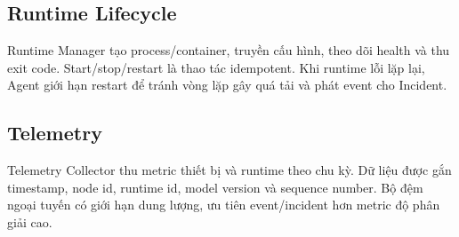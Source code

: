 \subsection{Runtime Lifecycle}

Runtime Manager tạo process/container, truyền cấu hình, theo dõi health và thu
exit code. Start/stop/restart là thao tác idempotent. Khi runtime lỗi lặp lại, Agent
giới hạn restart để tránh vòng lặp gây quá tải và phát event cho Incident.

\subsection{Telemetry}

Telemetry Collector thu metric thiết bị và runtime theo chu kỳ. Dữ liệu được gắn
timestamp, node id, runtime id, model version và sequence number. Bộ đệm ngoại
tuyến có giới hạn dung lượng, ưu tiên event/incident hơn metric độ phân giải cao.